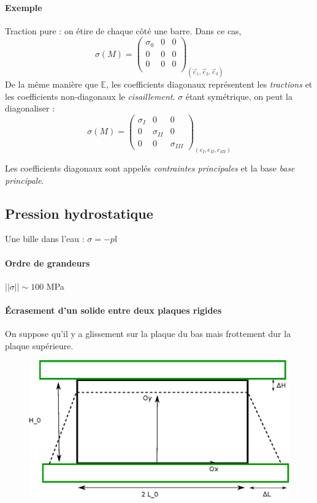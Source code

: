 \documentclass{article}
\begin{document}
\paragraph{Exemple} Traction pure : on étire de chaque côté une barre. Dans ce cas,
\[\sigma(M) = \begin{pmatrix}
\sigma_0 & 0 & 0\\
0 & 0 & 0\\
0 & 0 & 0\\
\end{pmatrix}_{(\vec{e}_1, \vec{e}_2, \vec{e}_3)}\]
\bigskip
De la même manière que $\mathbb{E}$, les coefficients diagonaux représentent les \emph{tractions} et les coefficients non-diagonaux le \emph{cisaillement}.
$\sigma$ étant symétrique, on peut la diagonaliser :
\[\sigma(M) = \begin{pmatrix}
\sigma_I & 0 & 0\\
0 & \sigma_{II} & 0\\
0 & 0 & \sigma_{III}
\end{pmatrix}_{(e_I, e_{II}, e_{III})}
\]

Les coefficients diagonaux sont appelés \emph{contraintes principales} et la base \emph{base principale}.


\subsection{Pression hydrostatique}
Une bille dans l'eau : $\sigma = -p \mathbb{I}$


\paragraph{Ordre de grandeurs} $|| \sigma || \sim 100$ MPa


\paragraph{Écrasement d'un solide entre deux plaques rigides} On suppose qu'il y a glissement sur la plaque du bas mais frottement dur la plaque supérieure.
\begin{figure}[!h]
\centering
\includegraphics[width=0.6\linewidth]{deux_plaques.eps}
\end{figure}
\end{document}
